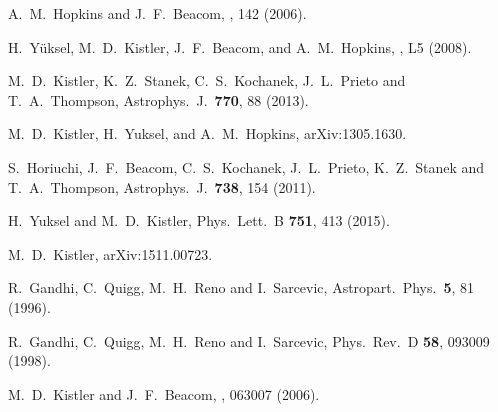 \documentclass[aps,prd,nofootinbib,twocolumn,floatfix,letterpaper,superscriptaddress,showpacs]{revtex4}
\begin{document}
\begin{thebibliography}{99}
  A.~M.\ Hopkins and J.~F.\ Beacom,
  , 142 (2006).

  H.\ Y{\"u}ksel, M.~D.\ Kistler, J.~F.\ Beacom, and A.~M.\ Hopkins,
  , L5 (2008).

  M.~D.~Kistler, K.~Z.~Stanek, C.~S.~Kochanek, J.~L.~Prieto and T.~A.~Thompson,
  Astrophys.\ J.\  {\bf 770}, 88 (2013).

  M.~D.\ Kistler, H.\ Yuksel, and A.~M.\ Hopkins,
  arXiv:1305.1630.






  S.~Horiuchi, J.~F.~Beacom, C.~S.~Kochanek, J.~L.~Prieto, K.~Z.~Stanek and T.~A.~Thompson,
  Astrophys.\ J.\  {\bf 738}, 154 (2011).

  H.~Yuksel and M.~D.~Kistler,
  Phys.\ Lett.\ B {\bf 751}, 413 (2015).


  M.~D.\ Kistler,
  arXiv:1511.00723.



  R.~Gandhi, C.~Quigg, M.~H.~Reno and I.~Sarcevic,
  Astropart.\ Phys.\  {\bf 5}, 81 (1996).

  R.~Gandhi, C.~Quigg, M.~H.~Reno and I.~Sarcevic,
  Phys.\ Rev.\  D {\bf 58}, 093009 (1998).


  M.~D.\ Kistler and J.~F.\ Beacom,
  , 063007 (2006).


\end{thebibliography}
\end{document}
